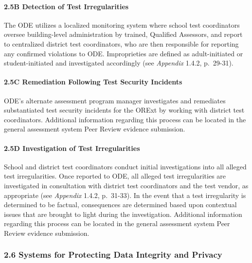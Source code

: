 \documentclass[]{article}
\let\oldparagraph\paragraph
\renewcommand{\paragraph}[1]{\oldparagraph{#1}\mbox{}}
\begin{document}
\hypertarget{b-detection-of-test-irregularities}{%
\paragraph{2.5B Detection of Test
Irregularities}\label{b-detection-of-test-irregularities}}

The ODE utilizes a localized monitoring system where school test
coordinators oversee building-level administration by trained, Qualified
Assessors, and report to centralized district test coordinators, who are
then responsible for reporting any confirmed violations to ODE.
Improprieties are defined as adult-initiated or student-initiated and
investigated accordingly (see \emph{Appendix} 1.4.2, p.~29-31).

\hypertarget{c-remediation-following-test-security-incidents}{%
\paragraph{2.5C Remediation Following Test Security
Incidents}\label{c-remediation-following-test-security-incidents}}

ODE's alternate assessment program manager investigates and remediates
substantiated test security incidents for the ORExt by working with
district test coordinators. Additional information regarding this
process can be located in the general assessment system Peer Review
evidence submission.

\hypertarget{d-investigation-of-test-irregularities}{%
\paragraph{2.5D Investigation of Test
Irregularities}\label{d-investigation-of-test-irregularities}}

School and district test coordinators conduct initial investigations
into all alleged test irregularities. Once reported to ODE, all alleged
test irregularities are investigated in consultation with district test
coordinators and the test vendor, as appropriate (see \emph{Appendix}
1.4.2, p.~31-33). In the event that a test irregularity is determined to
be factual, consequences are determined based upon contextual issues
that are brought to light during the investigation. Additional
information regarding this process can be located in the general
assessment system Peer Review evidence submission.

\hypertarget{systems-for-protecting-data-integrity-and-privacy}{%
\subsubsection{2.6 Systems for Protecting Data Integrity and
Privacy}\label{systems-for-protecting-data-integrity-and-privacy}}
\end{document}
